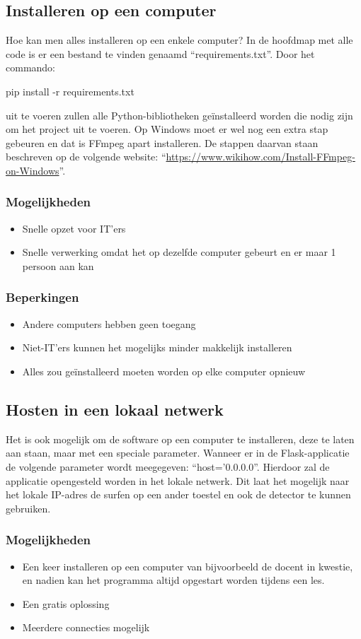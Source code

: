 \subsection{Installeren op een computer}
Hoe kan men alles installeren op een enkele computer?
In de hoofdmap met alle code is er een bestand te vinden genaamd ``requirements.txt''. Door het commando:
\begin{python}
    pip install -r requirements.txt
\end{python}
uit te voeren zullen alle Python-bibliotheken geïnstalleerd worden die nodig zijn om het project uit te voeren. Op Windows moet er wel nog een extra stap gebeuren en dat is FFmpeg apart installeren. De stappen daarvan staan beschreven op de volgende website: ``\url{https://www.wikihow.com/Install-FFmpeg-on-Windows}''.
\subsubsection{Mogelijkheden}
\begin{itemize}
    \item Snelle opzet voor IT'ers
    \item Snelle verwerking omdat het op dezelfde computer gebeurt en er maar 1 persoon aan kan
\end{itemize}
\subsubsection{Beperkingen}
\begin{itemize}
    \item Andere computers hebben geen toegang
    \item Niet-IT'ers kunnen het mogelijks minder makkelijk installeren
    \item Alles zou geïnstalleerd moeten worden op elke computer opnieuw
\end{itemize}

\subsection{Hosten in een lokaal netwerk}
Het is ook mogelijk om de software op een computer te installeren, deze te laten aan staan, maar met een speciale parameter. Wanneer er in de Flask-applicatie de volgende parameter wordt meegegeven: ``host='0.0.0.0''. Hierdoor zal de applicatie opengesteld worden in het lokale netwerk. Dit laat het mogelijk naar het lokale IP-adres de surfen op een ander toestel en ook de detector te kunnen gebruiken.
\subsubsection{Mogelijkheden}
\begin{itemize}
    \item Een keer installeren op een computer van bijvoorbeeld de docent in kwestie, en nadien kan het programma altijd opgestart worden tijdens een les.
    \item Een gratis oplossing
    \item Meerdere connecties mogelijk
\end{itemize}

